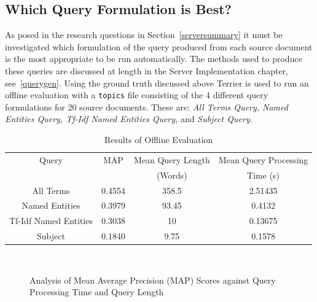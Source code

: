 \documentclass{l4proj}
\newcommand{\code}[1]{\texttt{#1}}
\begin{document}
\subsection{Which Query Formulation is Best?} \label{whichquery}
As posed in the research questions in Section~\ref{serversummary} it must be investigated which formulation of the query produced from each source document is the most appropriate to be run automatically. The methods used to produce these queries are discussed at length in the Server Implementation chapter, see~\ref{querygen}.
Using the ground truth discussed above Terrier is used to run an offline evaluation with a \code{topics} file consisting of the 4 different query formulations for 20 source documents. These are: \textit{All Terms Query, Named Entities Query, Tf-Idf Named Entities Query,} and \textit{Subject Query}.
\begin{center}
\begin{table}[h]
\centering
\begin{tabular}{|c|c|c|c|}
\hline
Query                 & MAP    & Mean Query Length & Mean Query Processing \\ 
& & (Words) & Time (s) \\\hline
All Terms             & 0.4554 & 358.5             & 2.51435                        \\ \hline
Named Entities        & 0.3979 & 93.45             & 0.4132                         \\ \hline
Tf-Idf Named Entities & 0.3038 & 10                & 0.13675                       \\ \hline
Subject               & 0.1840 & 9.75              & 0.1578                        \\ \hline
\end{tabular}
\caption{Results of Offline Evaluation}
\label{standard_results}
\end{table}
\end{center}

\begin{figure}[H]
\centering
\begin{subfigure}[t]{.5\textwidth}
\centering
{}
\end{subfigure}%
~
\begin{subfigure}[t]{.5\textwidth}
\centering
{}
\end{subfigure}
\caption{Analysis of Mean Average Precision (MAP) Scores against Query Processing Time and Query Length} \label{mapgraphs}
\end{figure}
\end{document}
